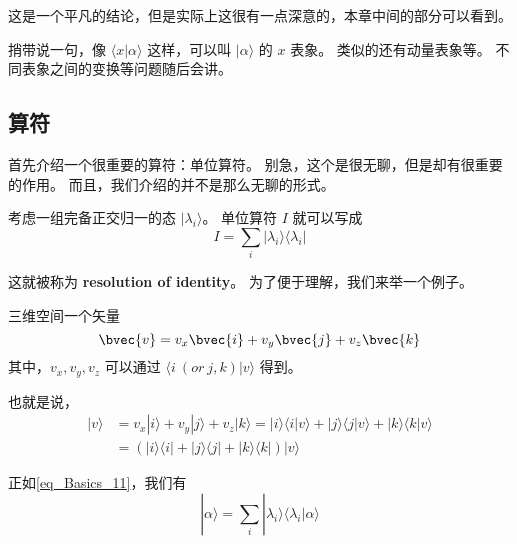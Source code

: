 这是一个平凡的结论，但是实际上这很有一点深意的，本章中间的部分可以看到。

捎带说一句，像 $\langle x|\alpha\rangle$ 这样，可以叫 $|\alpha \rangle$ 的 $x$ 表象。 类似的还有动量表象等。 不同表象之间的变换等问题随后会讲。

\subsection{算符}

首先介绍一个很重要的算符：单位算符。 别急，这个是很无聊，但是却有很重要的作用。 而且，我们介绍的并不是那么无聊的形式。

考虑一组完备正交归一的态 $|\lambda_i\rangle$。 单位算符 $I$ 就可以写成
\begin{equation}\label{eq_Basics_11}
I = \sum_i |\lambda_i\rangle\langle\lambda_i|
\end{equation}

这就被称为 \textbf{resolution of identity}。 为了便于理解，我们来举一个例子。

\begin{example}{}
三维空间一个矢量
\begin{equation}
\bvec{v} = v_x\bvec{i} + v_y\bvec{j} + v_z \bvec{k} 
\end{equation}
其中，$v_x, v_y, v_z$ 可以通过 $\langle i\ (or\ j, k)|v\rangle$ 得到。

也就是说，
\begin{equation}
\begin{split}
|v\rangle &= v_x|i\rangle + v_y|j\rangle + v_z|k\rangle = |i\rangle\langle i|v\rangle + |j\rangle\langle j|v\rangle + |k\rangle\langle k|v\rangle\\ &= (|i\rangle\langle i|+|j\rangle\langle j|+|k\rangle\langle k|)|v\rangle
\end{split}
\end{equation}
\end{example}{}
正如\autoref{eq_Basics_11}，我们有
\begin{equation}
|\alpha\rangle = \sum_i |\lambda_i\rangle\langle\lambda_i|\alpha\rangle
\end{equation}

